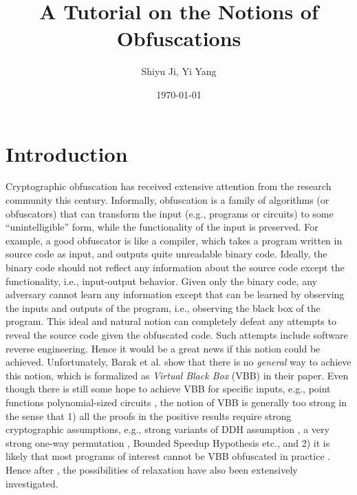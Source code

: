 \documentclass[12pt]{article}
\newcommand{\heading}[5]{
   \renewcommand{\thepage}{#1-\arabic{page}}
   \noindent
   \begin{center}
   \framebox[\textwidth]{
     \begin{minipage}{0.9\textwidth} \onehalfspacing
       {\bf CS 290G -- Introduction to Modern Cryptography} \hfill #2

       {\centering \Large #5
       
       }\medskip

       {\it #3 \hfill #4}
     \end{minipage}
   }
   \end{center}
}
\newcommand{\handout}[3]{\heading{#1}{#2}{Instructor:
Stefano Tessaro}{Student: Shiyu Ji, Yi Yang}{A Tutorial on the Notions of Obfuscations}}
\theoremstyle{definition}
\begin{document}
\title{A Tutorial on the Notions of Obfuscations}
\author{Shiyu Ji, Yi Yang}
\date{\today}
\maketitle

\section{Introduction}
Cryptographic obfuscation has received extensive attention from the research community this century. Informally, obfuscation is a family of algorithms (or obfuscators) that can transform the input (e.g., programs or circuits) to some ``unintelligible'' form, while the functionality of the input is preserved. For example, a good obfuscator is like a compiler, which takes a program written in source code as input, and outputs quite unreadable binary code. Ideally, the binary code should not reflect any information about the source code except the functionality, i.e., input-output behavior. Given only the binary code, any adversary cannot learn any information except that can be learned by observing the inputs and outputs of the program, i.e., observing the black box of the program. This ideal and natural notion can completely defeat any attempts to reveal the source code given the obfuscated code. Such attempts include software reverse engineering. Hence it would be a great news if this notion could be achieved. Unfortunately, Barak et al. \cite{barak2001possibility,barak2012possibility} show that there is no \emph{general} way to achieve this notion, which is formalized as \emph{Virtual Black Box} (VBB) in their paper. Even though there is still some hope to achieve VBB for specific inputs, e.g., point functions \cite{canetti1997towards, canetti1998perfectly, wee2005obfuscating} polynomial-sized circuits \cite{brakerski2014virtual,barak2014protecting}, the notion of VBB is generally too strong in the sense that 1) all the proofs in the positive results require strong cryptographic assumptions, e.g., strong variants of DDH assumption \cite{canetti1997towards,canetti1998perfectly}, a very strong one-way permutation \cite{wee2005obfuscating}, Bounded Speedup Hypothesis \cite{brakerski2014virtual} etc., and 2) it is likely that most programs of interest cannot be VBB obfuscated in practice \cite{goldwasser2005impossibility}. Hence after \cite{barak2001possibility}, the possibilities of relaxation have also been extensively investigated.
\end{document}
